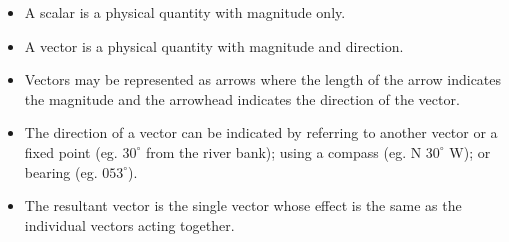 \begin{itemize}
\item A scalar is a physical quantity with magnitude only.
\item A vector is a physical quantity with magnitude and direction.
\item Vectors may be represented as arrows where the length of the arrow indicates the magnitude and the arrowhead indicates the direction of the vector.
\item The direction of a vector can be indicated by referring to another vector or a fixed point (eg. $30^{\circ}$ from the river bank); using a compass (eg. N $30^\circ$ W); or bearing (eg. $053 ^\circ$).
\item The resultant vector is the single vector whose effect is the same as the individual vectors acting together.
\end{itemize}
